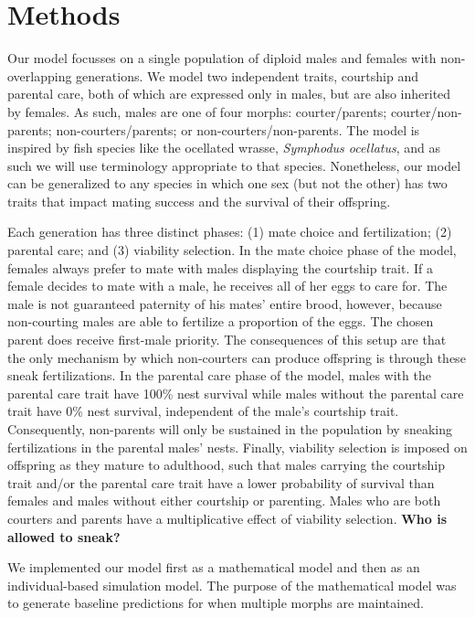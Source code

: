 \documentclass[11pt,]{article}
\begin{document}
\hypertarget{methods}{%
\section{Methods}\label{methods}}

Our model focusses on a single population of diploid males and females
with non-overlapping generations. We model two independent traits,
courtship and parental care, both of which are expressed only in males,
but are also inherited by females. As such, males are one of four
morphs: courter/parents; courter/non-parents; non-courters/parents; or
non-courters/non-parents. The model is inspired by fish species like the
ocellated wrasse, \emph{Symphodus ocellatus}, and as such we will use
terminology appropriate to that species. Nonetheless, our model can be
generalized to any species in which one sex (but not the other) has two
traits that impact mating success and the survival of their offspring.

Each generation has three distinct phases: (1) mate choice and
fertilization; (2) parental care; and (3) viability selection. In the
mate choice phase of the model, females always prefer to mate with males
displaying the courtship trait. If a female decides to mate with a male,
he receives all of her eggs to care for. The male is not guaranteed
paternity of his mates' entire brood, however, because non-courting
males are able to fertilize a proportion of the eggs. The chosen parent
does receive first-male priority. The consequences of this setup are
that the only mechanism by which non-courters can produce offspring is
through these sneak fertilizations. In the parental care phase of the
model, males with the parental care trait have 100\% nest survival while
males without the parental care trait have 0\% nest survival, independent
of the male's courtship trait. Consequently, non-parents will only be
sustained in the population by sneaking fertilizations in the parental
males' nests. Finally, viability selection is imposed on offspring as
they mature to adulthood, such that males carrying the courtship trait
and/or the parental care trait have a lower probability of survival than
females and males without either courtship or parenting. Males who are
both courters and parents have a multiplicative effect of viability
selection. \textbf{Who is allowed to sneak?}

We implemented our model first as a mathematical model and then as an
individual-based simulation model. The purpose of the mathematical model
was to generate baseline predictions for when multiple morphs are
maintained.
\end{document}
